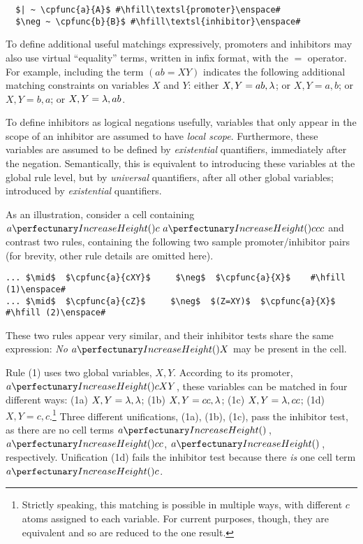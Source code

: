 \lstset{xleftmargin=.5in, xrightmargin=.5in} 
\begin{lstlisting}
  $| ~ \cpfunc{a}{A}$ #\hfill\textsl{promoter}\enspace#
  $\neg ~ \cpfunc{b}{B}$ #\hfill\textsl{inhibitor}\enspace#
\end{lstlisting}

To define additional useful matchings expressively, 
promoters and inhibitors may also use virtual ``equality'' terms, 
written in infix format, with the \(=\) operator.
For example, including the term \((ab = XY)\) indicates the following additional matching constraints on variables \(X\) and \(Y\): either \(X, Y = ab, \lambda\); or \(X, Y = a, b\); or \(X, Y = b, a\); or \(X, Y = \lambda, ab\).

To define inhibitors as logical negations usefully,
variables that only appear in the scope of an inhibitor are assumed to have \emph{local scope}. 
Furthermore, these variables are assumed to be defined by \emph{existential} quantifiers, immediately after the negation. 
Semantically, this is equivalent to introducing these variables at the global rule level, 
but by \emph{universal} quantifiers, after all other global variables;
introduced by \emph{existential} quantifiers.

As an illustration, consider a cell containing \(\cpfunc{a}{c} ~ \cpfunc{a}{ccc}\) and contrast two rules, 
containing the following two sample promoter/inhibitor pairs 
(for brevity, other rule details are omitted here).

\lstset{xleftmargin=.5in, xrightmargin=.5in} 
\begin{lstlisting}
... $\mid$  $\cpfunc{a}{cXY}$     $\neg$  $\cpfunc{a}{X}$    #\hfill (1)\enspace#
... $\mid$  $\cpfunc{a}{cZ}$     $\neg$  $(Z=XY)$  $\cpfunc{a}{X}$    #\hfill (2)\enspace#
\end{lstlisting}

These two rules appear very similar, and their inhibitor tests share the same expression: 
\emph{No} \(\cpfunc{a}{X}\) may be present in the cell.

Rule (1) uses two global variables, \(X, Y\). 
According to its promoter, \(\cpfunc{a}{cXY}\), these variables can be matched in four different ways:
(1a) \(X, Y = \lambda, \lambda\); (1b) \(X, Y = cc, \lambda\); (1c) \(X, Y = \lambda, cc\); (1d) \(X, Y = c, c\).\footnote{Strictly speaking, this matching is possible in multiple ways, with different \(c\) atoms assigned to each variable.  For current purposes, though, they are equivalent and so are reduced to the one result.}
Three different unifications, (1a), (1b), (1c), pass the inhibitor test, 
as there are no cell terms \(\cpfunc{a}{\,}\), \(\cpfunc{a}{cc}\), \(\cpfunc{a}{\,}\), respectively. 
Unification (1d) fails the inhibitor test because there \emph{is} one cell term \(\cpfunc{a}{c}\).

